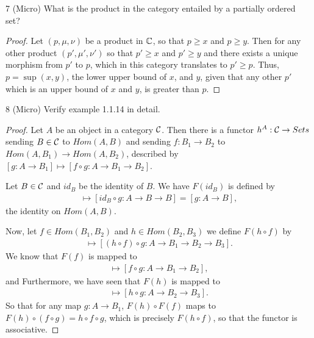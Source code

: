 \begin{exercise}{7 (Micro)}
What is the product in the category entailed by a partially ordered set?
\end{exercise}
\begin{proof}
Let $(p, \mu, \nu)$ be a product in $\mathbb{C}$, so that $p \geq x$ and $p \geq y$. 
Then for any other product $(p', \mu', \nu')$ so that $p' \geq x$ and $p' \geq y$ and there exists a unique morphism from $p'$ to $p$, which in this category translates to $p' \geq p$.
Thus, $p = \sup(x, y)$, the lower upper bound of $x$, and $y$, given that any other $p'$ which is an upper bound of $x$ and $y$, is greater than $p$.
\end{proof} 

\begin{exercise}{8 (Micro)}
Verify example 1.1.14 in detail.
\end{exercise}
\begin{proof}
Let $A$ be an object in a category $\mathcal{C}$.
Then there is a functor $h^A: \mathcal{C} \to Sets$ sending $B \in \mathcal{C}$ to $Hom(A, B)$ and sending $f: B_1 \to B_2$ to $Hom(A, B_1) \to Hom(A, B_2)$, described by $[g: A \to B_1] \mapsto [f \circ g: A \to B_1 \to B_2]$.

Let $B \in \mathcal{C}$ and $id_B$ be the identity of $B$. 
We have $F(id_B)$ is defined by 
\begin{align*}
    [g: A \to B] \mapsto [id_B \circ g: A \to B \to B] = [g: A \to B],
\end{align*}
the identity on $Hom(A, B)$.

Now, let $f \in Hom(B_1, B_2)$ and $h \in Hom(B_2, B_3)$ we define $F(h \circ f)$ by 
\begin{align*}
    [g: A \to B] \mapsto [(h \circ f) \circ g: A \to B_1 \to B_2 \to B_3].
\end{align*}
We know that $F(f)$ is mapped to 
\begin{align*}
    [g: A \to B_1] \mapsto [f \circ g: A \to B_1 \to B_2],
\end{align*}
and 
Furthermore, we have seen that $F(h)$ is mapped to 
\begin{align*}
    [g: A \to B_2] \mapsto [h \circ g: A \to B_2 \to B_3].
\end{align*}
So that for any map $g: A \to B_1$, $F(h) \circ F(f)$ maps to $F(h) \circ (f \circ g) = h \circ f \circ g$, which is precisely $F(h \circ f)$, so that the functor is associative.
\end{proof}


